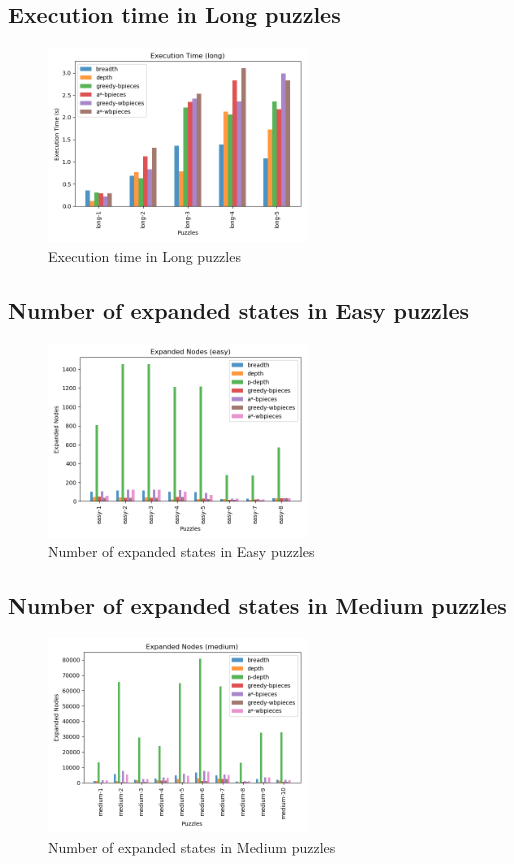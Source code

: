 \documentclass[conference]{IEEEtran}
\begin{document}
\subsection{Execution time in Long puzzles}
\begin{figure}[H]
    \centerline{\includegraphics[width=260px]{../../graphics/executionTime-long.png}}
    \caption{Execution time in Long puzzles}
\end{figure}

\subsection{Number of expanded states in Easy puzzles}
\begin{figure}[H]
    \centerline{\includegraphics[width=260px]{../../graphics/expandedNodes-easy.png}}
    \caption{Number of expanded states in Easy puzzles}
\end{figure}

\subsection{Number of expanded states in Medium puzzles}
\begin{figure}[H]
    \centerline{\includegraphics[width=260px]{../../graphics/expandedNodes-medium.png}}
    \caption{Number of expanded states in Medium puzzles}
\end{figure}
\end{document}
